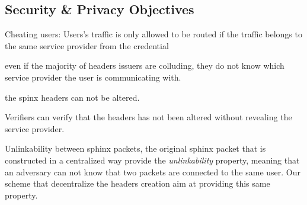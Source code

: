\subsection{Security \& Privacy Objectives}
\label{sec:sp-objectives}

\begin{objectives}
%
        \item Cheating users: Users's traffic is only allowed to be routed
if the traffic belongs to the same service provider from the credential
%
        \item even if the majority of headers issuers are colluding, they
do not know which service provider the user is communicating with.
%
        \item the spinx headers can not be altered.
%
        \item Verifiers can verify that the headers has not been altered
without revealing the service provider.
%
        \item Unlinkability between  sphinx packets, the original sphinx
packet that is constructed in a centralized way provide the
\textit{unlinkability} property, meaning that an adversary can not know
that two packets are connected to the same user. Our scheme that
decentralize the headers creation aim at providing this same property.
%
\end{objectives}


